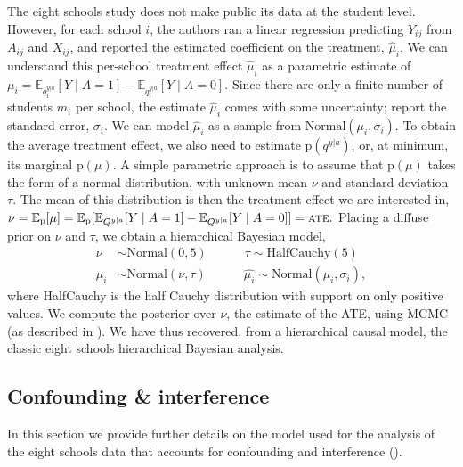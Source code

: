 \documentclass[12pt]{article}
\newcommand{\pr}{\mathrm{p}}
\begin{document}
The eight schools study does not make public its data at the student level.
However, for each school $i$, the authors ran a linear regression predicting $Y_{ij}$ from $A_{ij}$ and $X_{ij}$, and reported the estimated coefficient on the treatment, $\hat{\mu}_i$.
We can understand this per-school treatment effect $\hat{\mu}_i$ as a parametric estimate of $\mu_i = \mathbb{E}_{q^{y|a}_i}[Y \mid A = 1] - \mathbb{E}_{q^{y|a}_i}[Y \mid A = 0]$.
Since there are only a finite number of students $m_i$ per school, the estimate $\hat{\mu}_i$ comes with some uncertainty; \citep{Alderman1979-on} report the standard error, $\sigma_i$.
We can model $\hat{\mu}_i$ as a sample from $\mathrm{Normal}(\mu_i, \sigma_i)$.
To obtain the average treatment effect, we also need to estimate $\pr(q^{y|a})$, or, at minimum, its marginal $\pr(\mu)$.
A simple parametric approach is to assume that $\pr(\mu)$ takes the form of a normal distribution, with unknown mean $\nu$ and standard deviation $\tau$. The mean of this distribution is then the treatment effect we are interested in,
$\nu = \mathbb{E}_\pr[\mu] =  \mathbb{E}_\pr[\mathbb{E}_{Q^{y|a}}[Y \mid A = 1] - \mathbb{E}_{Q^{y|a}}[Y \mid A = 0]] = \textsc{ate}.$
Placing a diffuse prior on $\nu$ and $\tau$, we obtain a hierarchical Bayesian model,
\begin{equation*}
\begin{split}
\nu &\sim \mathrm{Normal}(0, 5) \quad \quad \quad \tau \sim \mathrm{HalfCauchy}(5)\\
\mu_i &\sim \mathrm{Normal}(\nu, \tau) \quad \quad \quad 
\hat{\mu_i} \sim \mathrm{Normal}(\mu_i, \sigma_i),
\end{split}
\end{equation*}
where HalfCauchy is the half Cauchy distribution with support on only positive values.
We compute the posterior over $\nu$, the estimate of the ATE, using MCMC (as described in ).
We have thus recovered, from a hierarchical causal model, the classic eight schools hierarchical Bayesian analysis.


\subsection{Confounding \& interference} \label{apx:eight_schools_interfere}

In this section we provide further details on the model used for the analysis of the eight schools data that accounts for confounding and interference ().
\end{document}
